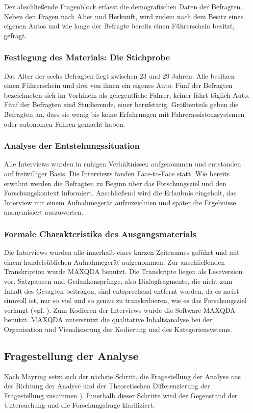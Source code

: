 \documentclass[12pt]{article}
\begin{document}
Der abschließende Fragenblock erfasst die demografischen Daten der Befragten. Neben den Fragen nach Alter und Herkunft, wird zudem nach dem Besitz eines eigenen Autos und wie lange der Befragte bereits einen Führerschein besitzt, gefragt.

\subsubsection*{Festlegung des Materials: Die Stichprobe}
Das Alter der sechs Befragten liegt zwischen 23 und 29 Jahren. Alle besitzen einen Führerschein und drei von ihnen ein eigenes Auto. Fünf der Befragten bezeichneten sich im Vorhinein als gelegentliche Fahrer, keiner fährt täglich Auto. Fünf der Befragten sind Studierende, einer berufstätig. Größtenteils geben die Befragten an, dass sie wenig bis keine Erfahrungen mit Fahrerassistenzsystemen oder autonomen Fahren gemacht haben.

\subsubsection*{Analyse der Entstehungssituation}
Alle Interviews wurden in ruhigen Verhältnissen aufgenommen und entstanden auf freiwilliger Basis. Die Interviews fanden Face-to-Face statt. Wie bereits erwähnt werden die Befragten zu Beginn über das Forschungsziel und den Forschungskontext informiert. Anschließend wird die Erlaubnis eingeholt, das Interview mit einem Aufnahmegerät aufzuzeichnen und später die Ergebnisse anonymisiert auszuwerten.

\subsubsection*{Formale Charakteristika des Ausgangsmaterials}
Die Interviews wurden alle innerhalb eines kurzen Zeitraumes geführt und mit einem handelsüblichen Aufnahmegerät aufgenommen. Zur anschließenden Transkription wurde MAXQDA benutzt. Die Transkripte liegen als Leseversion vor. Satzpausen und Gedankensprünge, also Dialogfragmente, die nicht zum Inhalt des Gesagten beitragen, sind entsprechend entfernt worden, da es meist sinnvoll ist, nur so viel und so genau zu transkribieren, wie es das Forschungsziel verlangt (vgl. \cite[108]{flick1995qualitative}).
Zum Kodieren der Interviews wurde die Software MAXQDA benutzt. MAXQDA unterstützt die qualitative Inhaltsanalyse bei der Organisation und Visualisierung der Kodierung und des Kategoriensystems.

\subsection{Fragestellung der Analyse}
Nach Mayring setzt sich der nächste Schritt, die \glq Fragestellung der Analyse\grq{} aus der \glq Richtung der Analyse\grq{} und der \glq Theoretischen Differenzierung der Fragestellung\grq{} zusammen \cite[53]{mayring2010qualitative}). Innerhalb dieser Schritte wird der Gegenstand der Untersuchung und die Forschungsfrage klarifiziert.
\end{document}

